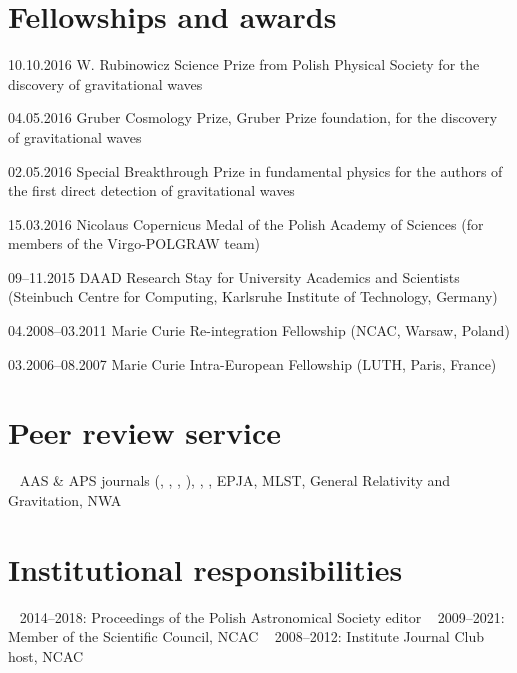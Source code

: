 \documentclass[]{friggeri-cv} %
\begin{document}

\section{Fellowships and awards}

\begin{entrylistshort}

\entrys 
{10.10.2016}
{W. Rubinowicz Science Prize from Polish Physical Society for the discovery of gravitational waves}  

\entrys 
{04.05.2016}
{Gruber Cosmology Prize, Gruber Prize foundation, for the discovery of gravitational waves}  

\entrys 
{02.05.2016}
{Special Breakthrough Prize in fundamental physics for the authors of the first direct detection of gravitational waves}  

\entrys
{15.03.2016} 
{Nicolaus Copernicus Medal of the Polish Academy of Sciences (for members of the Virgo-POLGRAW team)}   

\entrys
{09--11.2015} 
{DAAD Research Stay for University Academics and Scientists (Steinbuch Centre for Computing, Karlsruhe Institute of Technology, Germany)}  

\entrys 
{04.2008--03.2011} 
{Marie Curie Re-integration Fellowship (NCAC, Warsaw, Poland)}   

\entrys 
{03.2006--08.2007} 
{Marie Curie Intra-European Fellowship (LUTH, Paris, France)} 

\end{entrylistshort}





\pagebreak

\setlength{\voffset}{0pt}
\begin{aside} 
\section{Peer review service}
~ 
AAS \& APS journals ({\apj}, {\apjl}, {\prd}, {\prl}), 
{\mnras}, {\aap}, EPJA, MLST, General Relativity and Gravitation, NWA 
~
~ 
\section{Institutional responsibilities}
~
2014--2018: Proceedings of the Polish Astronomical Society editor
~
2009--2021: Member of the Scientific Council, NCAC 
~
2008--2012: Institute Journal Club host, NCAC
\end{aside} 
\end{document}
